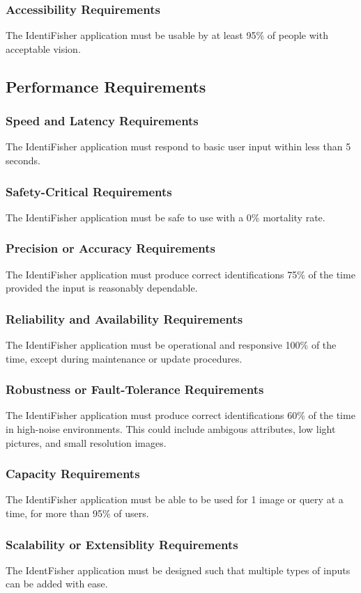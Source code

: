 \documentclass{article}
\begin{document}
\subsubsection{Accessibility Requirements}
The IdentiFisher application must be usable by at least 95\% of people with acceptable vision.
\subsection{Performance Requirements}
\subsubsection{Speed and Latency Requirements}
The IdentiFisher application must respond to basic user input within less than 5 seconds.
\subsubsection{Safety-Critical Requirements}
The IdentiFisher application must be safe to use with a 0\% mortality rate.
\subsubsection{Precision or Accuracy Requirements}
The IdentiFisher application must produce correct identifications 75\% of the time provided the input is reasonably dependable.
\subsubsection{Reliability and Availability Requirements}
The IdentiFisher application must be operational and responsive 100\% of the time, except during maintenance or update procedures.
\subsubsection{Robustness or Fault-Tolerance Requirements}
The IdentiFisher application must produce correct identifications 60\% of the time in high-noise environments. This could include
ambigous attributes, low light pictures, and small resolution images.
\subsubsection{Capacity Requirements}
The IdentiFisher application must be able to be used for 1 image or query at a time, for more than 95\% of users.
\subsubsection{Scalability or Extensiblity Requirements}
The IdentFisher application must be designed such that multiple types of inputs can be added with ease.
\end{document}
